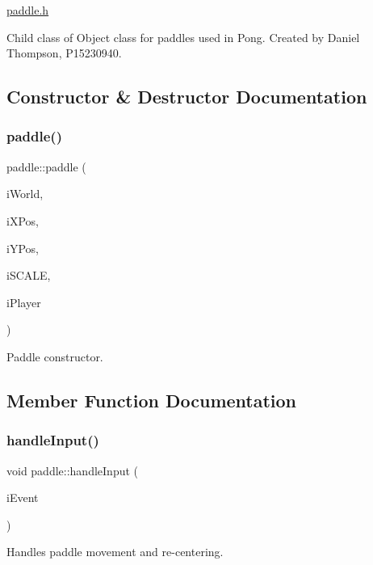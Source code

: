 \hyperlink{paddle_8h}{paddle.\+h}

Child class of Object class for paddles used in Pong. Created by Daniel Thompson, P15230940. 

\subsection{Constructor \& Destructor Documentation}
\mbox{\label{classpaddle_a49204236762e7810824271d3c7c793c5}} 
\subsubsection{\texorpdfstring{paddle()}{paddle()}}
{\footnotesize\ttfamily paddle\+::paddle (\begin{DoxyParamCaption}\item[{b2\+World \&}]{i\+World,  }\item[{float}]{i\+X\+Pos,  }\item[{float}]{i\+Y\+Pos,  }\item[{double}]{i\+S\+C\+A\+LE,  }\item[{int}]{i\+Player }\end{DoxyParamCaption})}



Paddle constructor. 



\subsection{Member Function Documentation}
\mbox{\label{classpaddle_ac20b5583e5d21b34dd831f0289aae244}} 
\subsubsection{\texorpdfstring{handle\+Input()}{handleInput()}}
{\footnotesize\ttfamily void paddle\+::handle\+Input (\begin{DoxyParamCaption}\item[{sf\+::\+Event \&}]{i\+Event }\end{DoxyParamCaption})}



Handles paddle movement and re-\/centering. 

